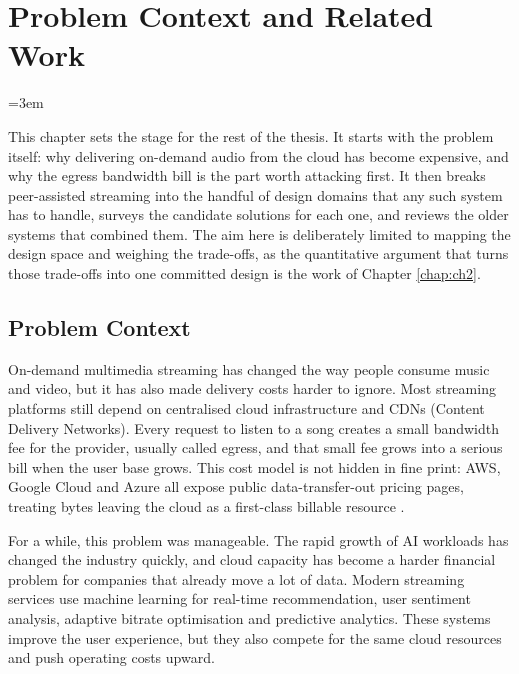 \chapter{Problem Context and Related Work}

\label{intro}

\emergencystretch=3em

\indent \par This chapter sets the stage for the rest of the thesis. It starts with the problem itself: why delivering on-demand audio from the cloud has become expensive, and why the egress bandwidth bill is the part worth attacking first. It then breaks peer-assisted streaming into the handful of design domains that any such system has to handle, surveys the candidate solutions for each one, and reviews the older systems that combined them. The aim here is deliberately limited to mapping the design space and weighing the trade-offs, as the quantitative argument that turns those trade-offs into one committed design is the work of Chapter \ref{chap:ch2}.

\section{Problem Context}

\indent \par On-demand multimedia streaming has changed the way people consume music and video, but it has also made delivery costs harder to ignore. Most streaming platforms still depend on centralised cloud infrastructure and CDNs (Content Delivery Networks). Every request to listen to a song creates a small bandwidth fee for the provider, usually called egress, and that small fee grows into a serious bill when the user base grows. This cost model is not hidden in fine print: AWS, Google Cloud and Azure all expose public data-transfer-out pricing pages, treating bytes leaving the cloud as a first-class billable resource \cite{aws_global_network_faq,google_cloud_network_pricing,azure_bandwidth_pricing}.

\par For a while, this problem was manageable. The rapid growth of AI workloads has changed the industry quickly, and cloud capacity has become a harder financial problem for companies that already move a lot of data. Modern streaming services use machine learning for real-time recommendation, user sentiment analysis, adaptive bitrate optimisation and predictive analytics. These systems improve the user experience, but they also compete for the same cloud resources and push operating costs upward.

